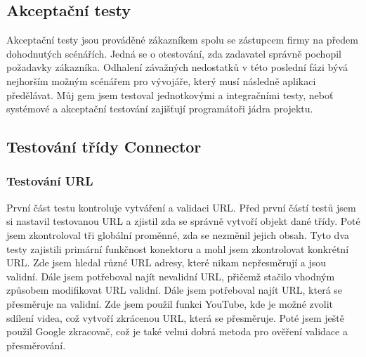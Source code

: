 \subsection{Akceptační testy}
\par Akceptační testy jsou prováděné zákazníkem spolu se zástupcem firmy na předem dohodnutých scénářích. Jedná se o otestování, zda zadavatel správně pochopil požadavky zákazníka. Odhalení závažných nedostatků v této poslední fázi bývá nejhorším možným scénářem pro vývojáře, který musí následně aplikaci předělávat. Můj gem jsem testoval jednotkovými a integračními testy, neboť systémové a akceptační testování zajišťují programátoři jádra projektu.


\subsection{Testování třídy Connector}
\subsubsection{Testování URL}
\par První část testu kontroluje vytváření a validaci URL. Před první částí testů jsem si nastavil testovanou URL a zjistil zda se správně vytvoří objekt dané třídy. Poté jsem zkontroloval tři globální proměnné, zda se nezměnil jejich obsah. Tyto dva testy zajistili primární funkčnost konektoru a mohl jsem zkontrolovat konkrétní URL. Zde jsem hledal různé URL adresy, které nikam nepřesměrují a jsou validní. Dále jsem potřeboval najít nevalidní URL, přičemž stačilo vhodným způsobem modifikovat URL validní. Dále jsem potřeboval najít URL, která se přesměruje na validní. Zde jsem použil funkci YouTube, kde je možné zvolit sdílení videa, což vytvoří zkrácenou URL, která se přesměruje. Poté jsem ještě použil Google zkracovač, což je také velmi dobrá metoda pro ověření validace a přesměrování. 
